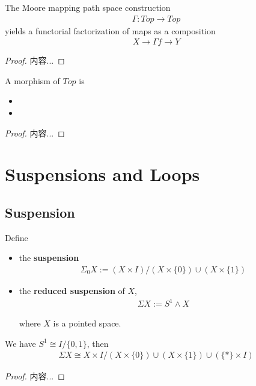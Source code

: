 \documentclass[Total.tex]{subfiles}
\begin{document}
				\begin{proposition}
					The Moore mapping path space construction 
					\begin{gather*}
						\Gamma:Top\rightarrow Top
					\end{gather*}
					yields a functorial factorization of maps 
					as a composition
					\begin{gather*}
						X\rightarrow \Gamma f\rightarrow Y
					\end{gather*}
				\end{proposition}
				\begin{proof}
					内容...
				\end{proof}
				
				\begin{proposition}
					A morphism of $Top$ is
					\begin{itemize}
						\item 
						\item 
					\end{itemize}
				\end{proposition}
				\begin{proof}
					内容...
				\end{proof}
		\section{Suspensions and Loops}
			\subsection{Suspension}
				\begin{Def}
					Define 
					\begin{itemize}
						\item the \textbf{suspension}
						\begin{gather*}
							\Sigma_0 X:=(X\times I)/(X\times \{0\})\cup (X\times \{1\})
						\end{gather*}
						\item the \textbf{reduced suspension} of $X$,
						\begin{gather*}
							\Sigma X:=S^1\wedge X
						\end{gather*}
						
						where $X$ is a pointed space.
					\end{itemize}
				\end{Def}
				
				\begin{proposition}
					We have $S^1\cong I/\{0,1\}$, then
					\begin{gather*}
						\Sigma X\cong X\times I/(X\times \{0\})\cup (X\times \{1\})\cup (\{*\}\times I)
					\end{gather*}
				\end{proposition}
				\begin{proof}
					内容...
				\end{proof}
				
\end{document}
